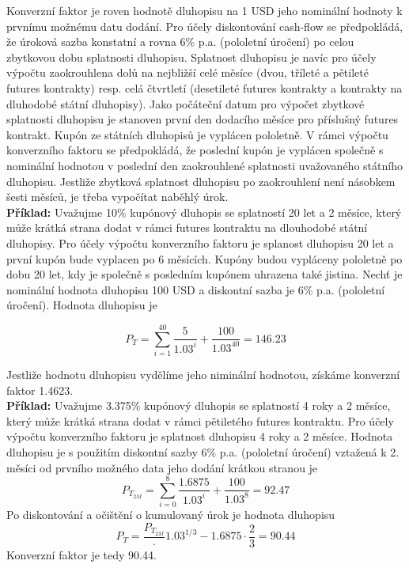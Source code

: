\documentclass[a4paper]{book}
\begin{document}
Konverzní faktor je roven hodnotě dluhopisu na 1 USD jeho nominální hodnoty k prvnímu možnému datu dodání. Pro účely diskontování cash-flow se předpokládá, že úroková sazba konstatní a rovna 6\% p.a. (pololetní úročení) po celou zbytkovou dobu splatnosti dluhopisu. Splatnost dluhopisu je navíc pro účely výpočtu zaokrouhlena dolů na nejbližší celé měsíce (dvou, tříleté a pětileté futures kontrakty) resp. celá čtvrtletí (desetileté futures kontrakty a kontrakty na dluhodobé státní dluhopisy). Jako počáteční datum pro výpočet zbytkové splatnosti dluhopisu je stanoven první den dodacího měsíce pro příslušný futures kontrakt. Kupón ze státních dluhopisů je vyplácen pololetně. V rámci výpočtu konverzního faktoru se předpokládá, že poslední kupón je vyplácen společně s nominální hodnotou v poslední den zaokrouhlené splatnosti uvažovaného státního dluhopisu. Jestliže zbytková splatnost dluhopisu po zaokrouhlení není násobkem šesti měsíců, je třeba vypočítat naběhlý úrok.\\

\noindent \textbf{Příklad:} Uvažujme 10\% kupónový dluhopis se splatností 20 let a 2 měsíce, který může krátká strana dodat v rámci futures kontraktu na dlouhodobé státní dluhopisy. Pro účely výpočtu konverzního faktoru je splanost dluhopisu 20 let a první kupón bude vyplacen po 6 měsících. Kupóny budou vypláceny pololetně po dobu 20 let, kdy je společně s posledním kupónem uhrazena také jistina. Nechť je nominální hodnota dluhopisu 100 USD a diskontní sazba je 6\% p.a. (pololetní úročení). Hodnota dluhopisu je

\begin{equation*}
  P_T = \sum_{i=1}^{40} \frac{5}{1.03^i} + \frac{100}{1.03^{40}} = 146.23
\end{equation*}

Jestliže hodnotu dluhopisu vydělíme jeho niminální hodnotou, získáme konverzní faktor 1.4623.\\

\noindent \textbf{Příklad:} Uvažujme 3.375\% kupónový dluhopis se splatností 4 roky a 2 měsíce, který může krátká strana dodat v rámci pětiletého futures kontraktu. Pro účely výpočtu konverzního faktoru je splatnost dluhopisu 4 roky a 2 měsíce. Hodnota dluhopisu je s použitím diskontní sazby 6\% p.a. (pololetní úročení) vztažená k 2. měsíci od prvního možného data jeho dodání krátkou stranou je
\begin{equation*}
P_{T_{2M}} = \sum_{i=0}^{8} \frac{1.6875}{1.03^i} + \frac{100}{1.03^{8}} = 92.47
\end{equation*}
Po diskontování a očištění o kumulovaný úrok je hodnota dluhopisu
\begin{equation*}
  P_T = \frac {P_{T_{2M}}} \cdot {1.03^{1/3}}-1.6875 \cdot {\frac{2}{3}}  = 90.44
\end{equation*}
Konverzní faktor je tedy 90.44.\\
\end{document}
